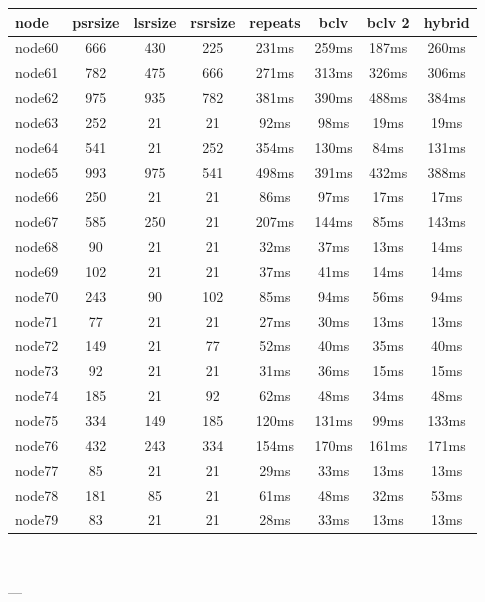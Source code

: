 \begin{tabular}{|l|c|c|c|c|c|c|c|}
\hline node & psrsize & lsrsize & rsrsize   & repeats & bclv & bclv 2 & hybrid\\
    \hline node60 & 666 & 430 & 225 & 231ms & 259ms & 187ms & 260ms\\
    \hline node61 & 782 & 475 & 666 & 271ms & 313ms & 326ms & 306ms\\
    \hline node62 & 975 & 935 & 782 & 381ms & 390ms & 488ms & 384ms\\
    \hline node63 & 252 & 21 & 21 & 92ms & 98ms & 19ms & 19ms\\
    \hline node64 & 541 & 21 & 252 & 354ms & 130ms & 84ms & 131ms\\
    \hline node65 & 993 & 975 & 541 & 498ms & 391ms & 432ms & 388ms\\
    \hline node66 & 250 & 21 & 21 & 86ms & 97ms & 17ms & 17ms\\
    \hline node67 & 585 & 250 & 21 & 207ms & 144ms & 85ms & 143ms\\
    \hline node68 & 90 & 21 & 21 & 32ms & 37ms & 13ms & 14ms\\
    \hline node69 & 102 & 21 & 21 & 37ms & 41ms & 14ms & 14ms\\
    \hline node70 & 243 & 90 & 102 & 85ms & 94ms & 56ms & 94ms\\
    \hline node71 & 77 & 21 & 21 & 27ms & 30ms & 13ms & 13ms\\
    \hline node72 & 149 & 21 & 77 & 52ms & 40ms & 35ms & 40ms\\
    \hline node73 & 92 & 21 & 21 & 31ms & 36ms & 15ms & 15ms\\
    \hline node74 & 185 & 21 & 92 & 62ms & 48ms & 34ms & 48ms\\
    \hline node75 & 334 & 149 & 185 & 120ms & 131ms & 99ms & 133ms\\
    \hline node76 & 432 & 243 & 334 & 154ms & 170ms & 161ms & 171ms\\
    \hline node77 & 85 & 21 & 21 & 29ms & 33ms & 13ms & 13ms\\
    \hline node78 & 181 & 85 & 21 & 61ms & 48ms & 32ms & 53ms\\
    \hline node79 & 83 & 21 & 21 & 28ms & 33ms & 13ms & 13ms\\

\hline
\end{tabular} \

---


